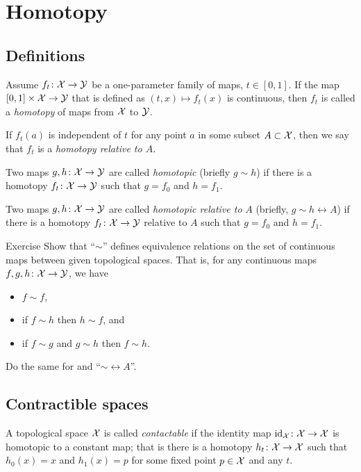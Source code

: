 \chapter{Homotopy}


\section{Definitions}

Assume $f_t\colon\mathcal{X}\to \mathcal{Y}$ be a one-parameter family of maps, $t\in [0,1]$.
If the map $[0,1]\times \mathcal{X}\to \mathcal{Y}$ that is defined as $(t,x)\mapsto f_t(x)$ is continuous, then $f_t$ is called a \emph{homotopy} of maps from $\mathcal{X}$ to $\mathcal{Y}$.

If $f_t(a)$ is independent of $t$ for any point $a$ in some subset $A\subset \mathcal{X}$, then we say that  $f_t$ is a \emph{homotopy relative to $A$}. 

Two maps $g,h\colon\mathcal{X}\to \mathcal{Y}$ are called \emph{homotopic} (briefly $g\sim h$)
if there is a homotopy $f_t\colon\mathcal{X}\to \mathcal{Y}$ such that $g=f_0$ and $h=f_1$.

Two maps $g,h\colon\mathcal{X}\to \mathcal{Y}$ are called \emph{homotopic relative to} $A$ (briefly, $g\sim h\rel A$)
if there is a homotopy $f_t\colon\mathcal{X}\to \mathcal{Y}$ relative to $A$ such that $g=f_0$ and $h=f_1$.

\begin{thm}{Exercise}\label{ex:hom-eq}
Show that ``$\sim$''  defines equivalence relations on the set of continuous maps between given topological spaces.
That is, for any continuous maps $f,g,h\colon\mathcal{X}\to \mathcal{Y}$, we have 
\begin{itemize}
\item $f\sim f$, 
\item if $f\sim h$ then $h\sim f$, and
\item if $f\sim g$ and $g\sim h$ then $f\sim h$.
\end{itemize}
Do the same for and ``$\sim\rel A$''.
\end{thm}



\section{Contractible spaces}

A topological space $\mathcal{X}$ is called \emph{contactable} if the identity map $\id_\c{X}\:\c{X}\z\to \c{X}$ is homotopic to a constant map;
that is there is a homotopy $h_t\colon\mathcal{X}\to\mathcal{X}$ such that $h_0(x)=x$ and $h_1(x)=p$ for some fixed point $p\in\mathcal{X}$ and any $t$.


